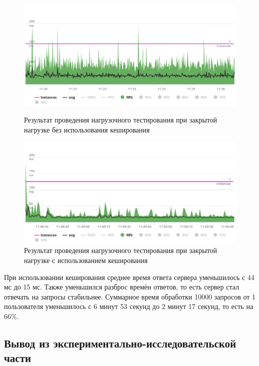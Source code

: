 \begin{figure}[h]
	\centering
	\includegraphics[width=\textwidth ]{img/Load_testing/const_load_instances_nocached.png}
	\caption{Результат проведения нагрузочного тестирования при закрытой нагрузке без использования кеширования}
	\label{fig:const_load_instances_nocached}
	
	\centering
	\includegraphics[width=\textwidth ]{img/Load_testing/const_load_instances_cached.png}
	\caption{Результат проведения нагрузочного тестирования при закрытой нагрузке с использованием кеширования}
	\label{fig:const_load_instances_cached}
\end{figure} 

\clearpage

При использовании кеширования среднее время ответа сервера уменьшилось с 44 мс до 15 мс. Также уменьшился разброс времён ответов, то есть сервер стал отвечать на запросы стабильнее. %
Суммарное время обработки 10000 запросов от 1 пользователя уменьшилось с 6 минут 53 секунд до 2 минут 17 секунд, то есть на 66\%.



\subsection*{Вывод из экспериментально-исследовательской части}

